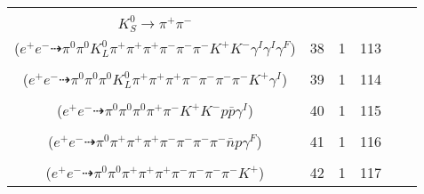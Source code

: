 \documentclass[landscape]{article}
\newcounter{rownumbers}
\newcommand\rn{\stepcounter{rownumbers}\arabic{rownumbers}}
\newcommand{\EOL}{\\} %
\newcommand{\topoTags}[1]{#1} %
\begin{document}
\begin{longtable}{clcccc}
\rn & \makecell[l]{ $ 
e^{+} e^{-} \rightarrow \pi^{0} \pi^{0} \pi^{-} \bar{K}^{0} K^{*} \bar{K}^{*} K^{*+} \gamma^{I} \gamma^{I} ,
\bar{K}^{0} \rightarrow K_{L}^{0} ,
K^{*} \rightarrow \pi^{-} K^{+} ,
\bar{K}^{*} \rightarrow \pi^{+} K^{-} \gamma^{F} ,
K^{*+} \rightarrow \pi^{+} K^{0} ,
K^{0} \rightarrow K_{S}^{0} ,
$ \\ $
K_{S}^{0} \rightarrow \pi^{+} \pi^{-} 
$ \\ ($
e^{+} e^{-} \dashrightarrow \pi^{0} \pi^{0} K_{L}^{0} \pi^{+} \pi^{+} \pi^{+} \pi^{-} \pi^{-} \pi^{-} K^{+} K^{-} \gamma^{I} \gamma^{I} \gamma^{F} 
$) } & \topoTags{38 & }1 & 113 \EOL

\rn & \makecell[l]{ $ 
e^{+} e^{-} \rightarrow \pi^{0} \rho^{0} \pi^{+} \pi^{-} \rho^{+} \rho^{-} \bar{K}^{0} K^{*} \gamma^{I} ,
\rho^{0} \rightarrow \pi^{+} \pi^{-} ,
\rho^{+} \rightarrow \pi^{0} \pi^{+} ,
\rho^{-} \rightarrow \pi^{0} \pi^{-} ,
\bar{K}^{0} \rightarrow K_{L}^{0} ,
K^{*} \rightarrow \pi^{-} K^{+} 
$ \\ ($
e^{+} e^{-} \dashrightarrow \pi^{0} \pi^{0} \pi^{0} K_{L}^{0} \pi^{+} \pi^{+} \pi^{+} \pi^{-} \pi^{-} \pi^{-} \pi^{-} K^{+} \gamma^{I} 
$) } & \topoTags{39 & }1 & 114 \EOL

\rn & \makecell[l]{ $ 
e^{+} e^{-} \rightarrow \pi^{0} \bar{K}^{*} K^{*+} \Lambda \bar{\Sigma}^{-} \gamma^{I} ,
\bar{K}^{*} \rightarrow \pi^{+} K^{-} ,
K^{*+} \rightarrow \pi^{0} K^{+} ,
\Lambda \rightarrow \pi^{-} p ,
\bar{\Sigma}^{-} \rightarrow \pi^{0} \bar{p} 
$ \\ ($
e^{+} e^{-} \dashrightarrow \pi^{0} \pi^{0} \pi^{0} \pi^{+} \pi^{-} K^{+} K^{-} p \bar{p} \gamma^{I} 
$) } & \topoTags{40 & }1 & 115 \EOL

\rn & \makecell[l]{ $ 
e^{+} e^{-} \rightarrow \rho^{0} \pi^{+} \pi^{-} \pi^{-} \omega \bar{n} p ,
\rho^{0} \rightarrow \pi^{+} \pi^{-} \gamma^{F} ,
\omega \rightarrow \pi^{0} \pi^{+} \pi^{-} 
$ \\ ($
e^{+} e^{-} \dashrightarrow \pi^{0} \pi^{+} \pi^{+} \pi^{+} \pi^{-} \pi^{-} \pi^{-} \pi^{-} \bar{n} p \gamma^{F} 
$) } & \topoTags{41 & }1 & 116 \EOL

\rn & \makecell[l]{ $ 
e^{+} e^{-} \rightarrow \pi^{+} \pi^{-} \rho^{-} \omega \bar{K}^{0} K^{+} ,
\rho^{-} \rightarrow \pi^{0} \pi^{-} ,
\omega \rightarrow \pi^{0} \pi^{+} \pi^{-} ,
\bar{K}^{0} \rightarrow K_{S}^{0} ,
K_{S}^{0} \rightarrow \pi^{+} \pi^{-} 
$ \\ ($
e^{+} e^{-} \dashrightarrow \pi^{0} \pi^{0} \pi^{+} \pi^{+} \pi^{+} \pi^{-} \pi^{-} \pi^{-} \pi^{-} K^{+} 
$) } & \topoTags{42 & }1 & 117 \EOL


\end{longtable}
\end{document}
